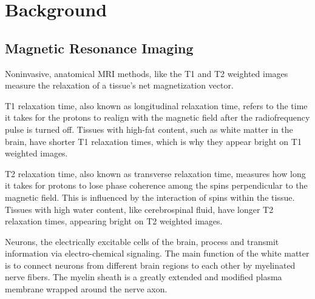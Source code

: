 \section{Background}

\subsection{Magnetic Resonance Imaging}

Noninvasive, anatomical \ac{MRI} methods, like the T1 and T2 weighted images measure the relaxation of a tissue's net magnetization vector. \cite{t1}\par
T1 relaxation time, also known as longitudinal relaxation time, refers to the time it takes for the protons to realign with the magnetic field after the radiofrequency pulse is turned off. Tissues with high-fat content, such as white matter in the brain, have shorter T1 relaxation times, which is why they appear bright on T1 weighted images. \cite{t1t2}\par
T2 relaxation time, also known as transverse relaxation time, measures how long it takes for protons to lose phase coherence among the spins perpendicular to the magnetic field. This is influenced by the interaction of spins within the tissue. Tissues with high water content, like cerebrospinal fluid, have longer T2 relaxation times, appearing bright on T2 weighted images. \cite{t1t2}\par

Neurons, the electrically excitable cells of the brain, process and transmit information via electro-chemical signaling. \cite{brain} The main function of the white matter is to connect neurons from different brain regions to each other by myelinated nerve fibers. \cite{white} The myelin sheath is a greatly extended and modified plasma membrane wrapped around the nerve axon. \cite{myelin}\par

